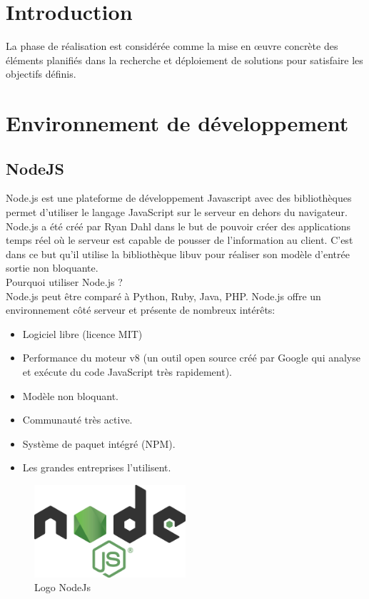 \documentclass[11pt,a4paper,oneside]{book}
\begin{document}
					\section{Introduction}
					La phase de réalisation est considérée comme la mise en œuvre concrète des éléments planifiés dans la recherche et déploiement de solutions pour satisfaire les objectifs définis.
					\section{Environnement de développement}
					\subsection{NodeJS}
					Node.js est une plateforme de développement Javascript avec des bibliothèques permet d'utiliser le langage JavaScript sur le serveur en dehors du navigateur.
					Node.js a été créé par Ryan Dahl dans le but de pouvoir créer des applications temps réel où le serveur est capable de pousser de l'information au client. C'est dans ce but qu'il utilise la bibliothèque libuv pour réaliser son modèle d'entrée sortie non bloquante.\\
					Pourquoi utiliser Node.js ?\\
					Node.js peut être comparé à Python, Ruby, Java, PHP. Node.js offre un environnement côté serveur et présente de nombreux intérêts:
					\begin{itemize}
						\item Logiciel libre (licence MIT)
						\item Performance du moteur v8 (un outil open source créé par Google qui analyse et exécute du code JavaScript très rapidement).
						\item Modèle non bloquant.
						\item Communauté très active.
						\item Système de paquet intégré (NPM).
						\item Les grandes entreprises l'utilisent.
					\end{itemize}
					\begin{figure}[H]
						\centering
						\includegraphics[width=0.5\textwidth]{Images/ch4/nodejs}
						\caption{Logo NodeJs}
						\label{fig:nodejs}
					\end{figure}
\end{document}

